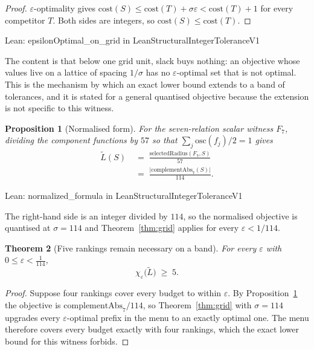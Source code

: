 \documentclass[conference]{IEEEtran}
\newtheorem{theorem}{Theorem}
\newtheorem{proposition}[theorem]{Proposition}
\theoremstyle{definition}
\newcommand{\lean}[1]{\textsf{\footnotesize #1}}
\newcommand{\leanbox}[1]{%
  \par\vspace{2pt}\noindent
  {\footnotesize\textsf{Lean: #1}}\par\vspace{2pt}}
\begin{document}
\begin{proof}
$\varepsilon$-optimality gives $\mathrm{cost}(S)\le\mathrm{cost}(T)+\sigma\varepsilon
<\mathrm{cost}(T)+1$ for every competitor $T$. Both sides are integers, so
$\mathrm{cost}(S)\le\mathrm{cost}(T)$.
\end{proof}

\leanbox{\lean{epsilonOptimal\_on\_grid} in \lean{LeanStructuralIntegerToleranceV1}}

The content is that below one grid unit, slack buys nothing: an objective whose values live
on a lattice of spacing $1/\sigma$ has no $\varepsilon$-optimal set that is not optimal. This
is the mechanism by which an exact lower bound extends to a band of tolerances, and it is
stated for a general quantised objective because the extension is not specific to this
witness.

\begin{proposition}[Normalised form]
\label{prop:normform}
For the seven-relation scalar witness $F_{7}$, dividing the component functions by $57$ so
that $\sum_{j}\mathrm{osc}(f_{j})/2=1$ gives
\begin{equation}
\begin{aligned}
\widetilde{L}(S)
&\;=\;\frac{\mathrm{selectedRadius}(F_{7},S)}{57}\\
&\;=\;\frac{\bigl|\mathrm{complementAbs}_{7}(S)\bigr|}{114}.
\end{aligned}
\label{eq:normform}
\end{equation}
\end{proposition}

\leanbox{\lean{normalized\_formula} in \lean{LeanStructuralIntegerToleranceV1}}

The right-hand side is an integer divided by $114$, so the normalised objective is quantised
at $\sigma=114$ and Theorem~\ref{thm:grid} applies for every $\varepsilon<1/114$.

\begin{theorem}[Five rankings remain necessary on a band]
\label{thm:fiveband}
For every $\varepsilon$ with $0\le\varepsilon<\tfrac{1}{114}$,
\begin{equation}
\chi_{\varepsilon}\bigl(\widetilde{L}\bigr)\;\geq\;5 .
\label{eq:fiveband}
\end{equation}
\end{theorem}

\begin{proof}
Suppose four rankings cover every budget to within $\varepsilon$. By
Proposition~\ref{prop:normform} the objective is $\mathrm{complementAbs}_{7}/114$, so
Theorem~\ref{thm:grid} with $\sigma=114$ upgrades every $\varepsilon$-optimal prefix in the
menu to an exactly optimal one. The menu therefore covers every budget exactly with four
rankings, which the exact lower bound for this witness forbids.
\end{proof}
\end{document}
